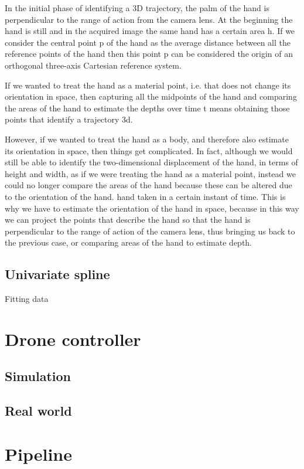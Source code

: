 In the initial phase of identifying a 3D trajectory, the palm of the hand is perpendicular to the range of action from the camera lens. At the beginning the hand is still and in the acquired image the same hand has a certain area h. If we consider the central point p of the hand as the average distance between all the reference points of the hand then this point p can be considered the origin of an orthogonal three-axis Cartesian reference system.

\noindent If we wanted to treat the hand as a material point, i.e. that does not change its orientation in space, then capturing all the midpoints of the hand and comparing the areas of the hand to estimate the depths over time t means obtaining those points that identify a trajectory 3d.

\noindent However, if we wanted to treat the hand as a body, and therefore also estimate its orientation in space, then things get complicated. In fact, although we would still be able to identify the two-dimensional displacement of the hand, in terms of height and width, as if we were treating the hand as a material point, instead we could no longer compare the areas of the hand because these can be altered due to the orientation of the hand. hand taken in a certain instant of time. This is why we have to estimate the orientation of the hand in space, because in this way we can project the points that describe the hand so that the hand is perpendicular to the range of action of the camera lens, thus bringing us back to the previous case, or comparing areas of the hand to estimate depth.

\subsection{Univariate spline}
\label{sec:univspline}
Fitting data

\section{Drone controller}
\label{sec:dronecontrl}

\subsection{Simulation}
\label{sec:simulation}

\subsection{Real world}
\label{sec:simulation}

\section{Pipeline}
\label{sec:pipeline}
